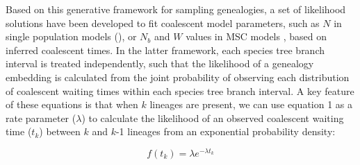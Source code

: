 \documentclass[11pt]{article}
\begin{document}
Based on this generative framework for sampling genealogies, a set of likelihood
solutions have been developed to fit coalescent model parameters, such as 
$N$ in single population models (\citep{kingman1982coalescent}), 
or $N_b$ and $W$ values in MSC 
models \citep{rannala2003bayes}, based on inferred coalescent times. 
In the latter framework, each species tree branch interval is treated independently, 
such that the likelihood of a genealogy embedding is calculated from the joint
probability of observing each distribution of coalescent waiting times within
each species tree branch interval. A key feature of these equations is that 
when $k$ lineages are present, we can use equation 1 as a rate parameter ($\lambda$)
to calculate the likelihood of an observed coalescent waiting time ($t_k$) between
$k$ and $k$-1 lineages from an exponential probability density:
	
\begin{equation}
	f(t_k) = \lambda e^{-\lambda t_k} 	
\end{equation}





\end{document}
